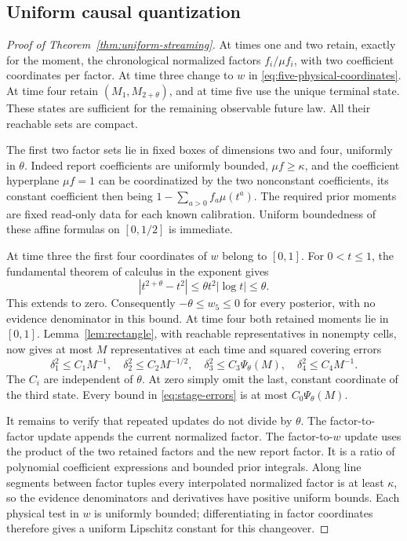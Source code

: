 \documentclass[11pt]{amsart}
\theoremstyle{definition}\newtheorem{definition}[theorem]{Definition}
\theoremstyle{remark}\newtheorem{remark}[theorem]{Remark}
\begin{document}
\subsection{Uniform causal quantization}
\begin{proof}[Proof of Theorem~\ref{thm:uniform-streaming}]
At times one and two retain, exactly for the moment, the chronological
normalized factors $f_i/\mu f_i$, with two coefficient coordinates per
factor. At time three change to $w$ in
\eqref{eq:five-physical-coordinates}. At time four retain
$(M_1,M_{2+\theta})$, and at time five use the unique terminal state.
These states are sufficient for the remaining observable future law.
All their reachable sets are compact.

The first two factor sets lie in fixed boxes of dimensions two and four,
uniformly in $\theta$. Indeed report coefficients are uniformly bounded,
$\mu f\ge\kappa$, and the coefficient hyperplane $\mu f=1$ can be
coordinatized by the two nonconstant coefficients, its constant coefficient
then being $1-\sum_{a>0}f_a\mu(t^a)$. The required prior moments are
fixed read-only data for each known calibration. Uniform boundedness of
these affine formulas on $[0,1/2]$ is immediate.

At time three the first four coordinates of $w$ belong to $[0,1]$.
For $0<t\le1$, the fundamental theorem of calculus in the exponent gives
\[
 |t^{2+\theta}-t^2|
   \le\theta t^2|\log t|\le\theta.
\]
This extends to zero. Consequently $-\theta\le w_5\le0$ for every
posterior, with no evidence denominator in this bound. At time four
both retained moments lie in $[0,1]$. Lemma~\ref{lem:rectangle}, with
reachable representatives in nonempty cells, now gives at most $M$
representatives at each time and squared covering errors
\begin{equation}\label{eq:stage-errors}
 \delta_1^2\le C_1M^{-1},\quad
 \delta_2^2\le C_2M^{-1/2},\quad
 \delta_3^2\le C_3\Psi_\theta(M),\quad
 \delta_4^2\le C_4M^{-1}.
\end{equation}
The $C_i$ are independent of $\theta$. At zero simply omit the last,
constant coordinate of the third state. Every bound in
\eqref{eq:stage-errors} is at most $C_0\Psi_\theta(M)$.

It remains to verify that repeated updates do not divide by $\theta$.
The factor-to-factor update appends the current normalized factor. The
factor-to-$w$ update uses the product of the two retained factors and the
new report factor. It is a ratio of polynomial coefficient expressions
and bounded prior integrals. Along line segments between factor tuples
every interpolated normalized factor is at least $\kappa$, so the evidence
denominators and derivatives have positive uniform bounds. Each physical
test in $w$ is uniformly bounded; differentiating in factor coordinates
therefore gives a uniform Lipschitz constant for this changeover.


\end{proof}
\end{document}
